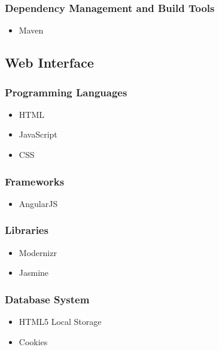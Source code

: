 \documentclass[a4paper,10pt]{article}
\begin{document}
\subsubsection{Dependency Management and Build Tools}
	\begin{itemize}
		\item Maven
	\end{itemize}

\subsection{Web Interface}
\subsubsection{Programming Languages}
	\begin{itemize}
		\item HTML
		\item JavaScript
		\item CSS
	\end{itemize}

\subsubsection{Frameworks}
	\begin{itemize}
		\item AngularJS
	\end{itemize}

\subsubsection{Libraries}
	\begin{itemize}
		\item Modernizr

		\item Jasmine
	\end{itemize}

\subsubsection{Database System}
	\begin{itemize}
		\item HTML5 Local Storage
		\item Cookies
	\end{itemize}
\end{document}
